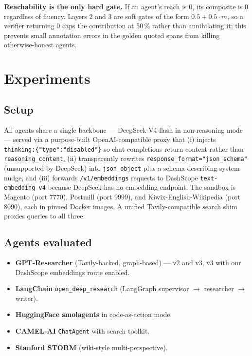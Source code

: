 \documentclass[11pt]{article}
\begin{document}
\textbf{Reachability is the only hard gate.} If an agent's reach is 0,
its composite is 0 regardless of fluency. Layers 2 and 3 are soft
gates of the form $0.5 + 0.5\cdot m$, so a verifier returning 0 caps
the contribution at 50\,\% rather than annihilating it; this prevents
small annotation errors in the golden quoted spans from killing
otherwise-honest agents.

\section{Experiments}
\label{sec:experiments}

\subsection{Setup}

All agents share a single backbone --- DeepSeek-V4-flash in
non-reasoning mode --- served via a purpose-built OpenAI-compatible proxy
that (i) injects \texttt{thinking:\{"type":"disabled"\}} so chat completions
return content rather than \texttt{reasoning\_content}, (ii) transparently
rewrites \texttt{response\_format="json\_schema"} (unsupported by DeepSeek)
into \texttt{json\_object} plus a schema-describing system nudge, and
(iii) forwards \texttt{/v1/embeddings} requests to DashScope
\texttt{text-embedding-v4} because DeepSeek has no embedding endpoint.
The sandbox is Magento (port 7770), Postmill (port 9999), and
Kiwix-English-Wikipedia (port 8090), each in pinned Docker images.
A unified Tavily-compatible search shim proxies queries to all three.

\subsection{Agents evaluated}

\begin{itemize}[leftmargin=*,itemsep=1pt]
  \item \textbf{GPT-Researcher} (Tavily-backed, graph-based) --- v2 and v3,
    v3 with our DashScope embeddings route enabled.
  \item \textbf{LangChain} \texttt{open\_deep\_research} (LangGraph
    supervisor $\rightarrow$ researcher $\rightarrow$ writer).
  \item \textbf{HuggingFace smolagents} in code-as-action mode.
  \item \textbf{CAMEL-AI} \texttt{ChatAgent} with search toolkit.
  \item \textbf{Stanford STORM} (wiki-style multi-perspective).
\end{itemize}
\end{document}
